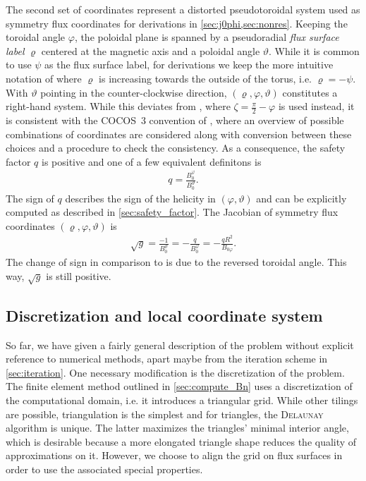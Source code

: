 \documentclass[a4paper, twoside, 10pt, english]{article}
\numberwithin{equation}{section}
\let\temp\varrho
\let\varrho\rho
\let\rho\temp
\let\temp\vartheta
\let\vartheta\theta
\let\theta\temp
\let\temp\varphi
\let\varphi\phi
\let\phi\temp
\begin{document}
The second set of coordinates represent a distorted pseudotoroidal system used as symmetry flux coordinates for derivations in \cref{sec:j0phi,sec:nonres}. Keeping the toroidal angle $\phi$, the poloidal plane is spanned by a pseudoradial \emph{flux surface label} $\rho$ centered at the magnetic axis and a poloidal angle $\theta$. While it is common to use $\psi$ as the flux surface label, for derivations we keep the more intuitive notation of \textcite{dHaeseleer91} where $\rho$ is increasing towards the outside of the torus, i.e. $\rho = -\psi$. With $\theta$ pointing in the counter-clockwise direction, $(\rho, \phi, \theta)$ constitutes a right-hand system. While this deviates from \textcite{dHaeseleer91}, where $\zeta = \frac{\pi}{2} - \phi$ is used instead, it is consistent with the COCOS~3 convention of \textcite{Sauter13}, where an overview of possible combinations of coordinates are considered along with conversion between these choices and a procedure to check the consistency. As a consequence, the safety factor $q$ is positive and one of a few equivalent definitons is
\begin{gather}
  q = \frac{B_{0}^{\phi}}{B_{0}^{\theta}}. \label{eq:q_field_line_pitch}
\end{gather}
The sign of $q$ describes the sign of the helicity in $(\phi, \theta)$ and can be explicitly computed as described in \cref{sec:safety_factor}. The Jacobian of symmetry flux coordinates $(\rho, \phi, \theta)$ is
\begin{gather}
  \sqrt{g} = \frac{-1}{B_{0}^{\theta}} = -\frac{q}{B_{0}^{\phi}} = -\frac{q R^{2}}{B_{0 \phi}}. \label{eq:flux_metric}
\end{gather}
The change of sign in comparison to \textcite{dHaeseleer91} is due to the reversed toroidal angle. This way, $\sqrt{g}$ is still positive.

\subsection{Discretization and local coordinate system}
\label{sec:grid}

So far, we have given a fairly general description of the problem without explicit reference to numerical methods, apart maybe from the iteration scheme in \cref{sec:iteration}. One necessary modification is the discretization of the problem. The finite element method outlined in \cref{sec:compute_Bn} uses a discretization of the computational domain, i.e. it introduces a triangular grid. While other tilings are possible, triangulation is the simplest and for triangles, the \textsc{Delaunay} algorithm is unique. The latter maximizes the triangles' minimal interior angle, which is desirable because a more elongated triangle shape reduces the quality of approximations on it. However, we choose to align the grid on flux surfaces in order to use the associated special properties.
\end{document}
